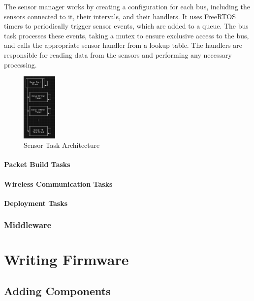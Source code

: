 \documentclass{book}
\begin{document}
\par The sensor manager works by creating a configuration for each bus, including the sensors connected to it, their intervals, and their handlers. It uses FreeRTOS timers to periodically trigger sensor events, which are added to a queue. The bus task processes these events, taking a mutex to ensure exclusive access to the bus, and calls the appropriate sensor handler from a lookup table. The handlers are responsible for reading data from the sensors and performing any necessary processing.

\begin{figure} [H]
    \centering
    \includegraphics[width=0.15\textwidth]{images/sensor-architechure.png}
    \caption{Sensor Task Architecture}
    \label{fig:sensor-architecture} 
\end{figure} 

\subsubsection{Packet Build Tasks}
\subsubsection{Wireless Communication Tasks}
\subsubsection{Deployment Tasks}

\subsection{Middleware}



\chapter{Writing Firmware}

\section{Adding Components}
\end{document}
